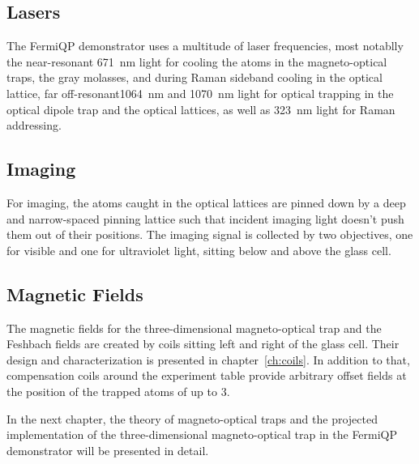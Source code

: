 \subsection*{Lasers}
The FermiQP demonstrator uses a multitude of laser frequencies, most notablly the near-resonant \SI[]{671}{\nano\meter} light for cooling the atoms in the magneto-optical traps, the gray molasses, and during Raman sideband cooling in the optical lattice, far off-resonant\SI[]{1064}{\nano\meter} and \SI[]{1070}{\nano\meter}  light for optical trapping in the optical dipole trap and the optical lattices, as well as \SI[]{323}{\nano\meter} light for Raman addressing.

\subsection*{Imaging}
For imaging, the atoms caught in the optical lattices are pinned down by a deep and narrow-spaced pinning lattice such that incident imaging light doesn't push them out of their positions. The imaging signal is collected by two objectives, one for visible and one for ultraviolet light, sitting below and above the glass cell.

\subsection*{Magnetic Fields}
The magnetic fields for the three-dimensional magneto-optical trap and the Feshbach fields are created by coils sitting left and right of the glass cell. Their design and characterization is presented in chapter~\ref{ch:coils}. In addition to that, compensation coils around the experiment table provide arbitrary offset fields at the position of the trapped atoms of up to \SI[]{3}{\gauss}.

\null

In the next chapter, the theory of magneto-optical traps and the projected implementation of the three-dimensional magneto-optical trap in the FermiQP demonstrator will be presented in detail.